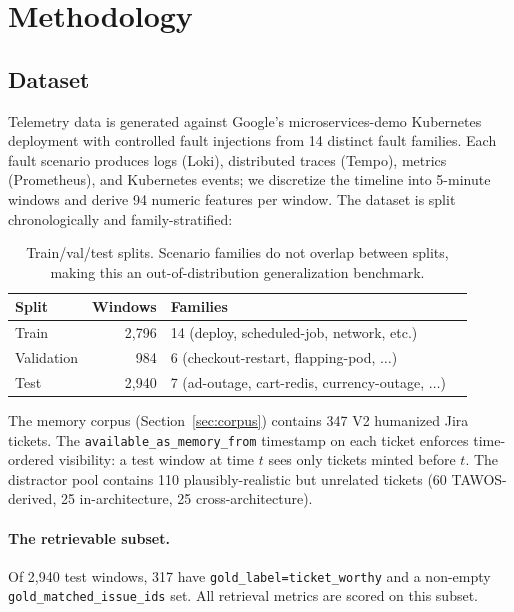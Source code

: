\section{Methodology}
\label{sec:method}

\subsection{Dataset}

Telemetry data is generated against Google's microservices-demo Kubernetes deployment with controlled fault injections from 14 distinct fault families. Each fault scenario produces logs (Loki), distributed traces (Tempo), metrics (Prometheus), and Kubernetes events; we discretize the timeline into 5-minute windows and derive 94 numeric features per window. The dataset is split chronologically and family-stratified:

\begin{table}[h]
\centering
\caption{Train/val/test splits. Scenario families do not overlap between splits, making this an out-of-distribution generalization benchmark.}
\label{tab:splits}
\begin{tabular}{lrll}
\toprule
Split & Windows & Families \\
\midrule
Train       & 2{,}796 & 14 (deploy, scheduled-job, network, etc.) \\
Validation  &   984  & 6  (checkout-restart, flapping-pod, $\ldots$) \\
Test        & 2{,}940 & 7  (ad-outage, cart-redis, currency-outage, $\ldots$) \\
\bottomrule
\end{tabular}
\end{table}

The memory corpus (Section~\ref{sec:corpus}) contains 347 V2 humanized Jira tickets. The \texttt{available\_as\_memory\_from} timestamp on each ticket enforces time-ordered visibility: a test window at time $t$ sees only tickets minted before $t$. The distractor pool contains 110 plausibly-realistic but unrelated tickets (60 \textsc{TAWOS}-derived, 25 in-architecture, 25 cross-architecture).

\paragraph{The retrievable subset.} Of 2{,}940 test windows, 317 have \texttt{gold\_label=ticket\_worthy} and a non-empty \texttt{gold\_matched\_issue\_ids} set. All retrieval metrics are scored on this subset.

